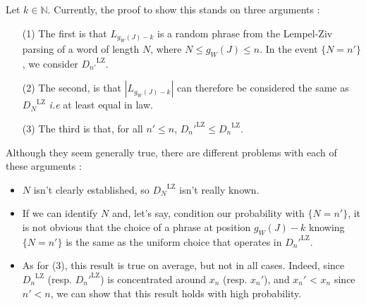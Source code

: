 \noindent
\hypertarget{critics}{}
Let $k \in\mathbb{N}$.
Currently, the proof to show this stands on three arguments :

\begin{itemize}
    \item[(1)] The first is that $L_{g_W(J)-k}$ is  
          a random phrase from the Lempel-Ziv parsing of 
          a word of length $N$, where $N \leq g_W(J) \leq n$.
          In the event $\{ N = n' \}$, we consider 
          ${D_{n'}}^{\text{LZ}}$.

    \item[(2)] The second, is that $|L_{g_W(J)-k}|$ can 
          therefore be considered the same as ${D_N}^{\text{LZ}}$
          \textit{i.e} at least equal in law.

    \item[(3)] The third is that, for all $n'\leq n$, 
        ${D_n'}^{\text{LZ}} \leq {D_n}^{\text{LZ}}$.
\end{itemize}

Although they seem generally true,
there are different problems with each of these arguments :

\begin{itemize}
    \item $N$ isn't clearly established, so 
          ${D_N}^{\text{LZ}}$ isn't really known.

    \item If we can identify $N$ and, let's say,
          condition our probability with $\{ N = n' \}$, 
          it is not obvious
          that the choice of a phrase at position ${g_W(J)-k}$
          knowing $\{ N = n' \}$
          is the same as the uniform choice that operates
          in ${D_n'}^{\text{LZ}}$.

    \item As for (3), this result is true on average, but 
          not in all cases. Indeed, since ${D_n}^{\text{LZ}}$
          (resp. ${D_n'}^{\text{LZ}}$) is concentrated
          around $x_n$ (resp. $x_n'$), and $x_n'$ < $x_n$
          since $n' < n$, we can show 
          that this result holds with high probability.
\end{itemize}